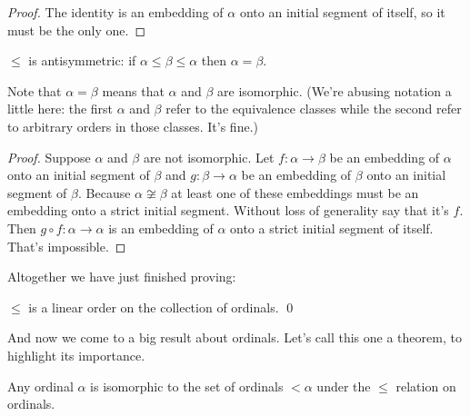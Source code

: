 \documentclass[10pt]{amsart}
\begin{document}
\begin{proof}
The identity is an  embedding of $\alpha$ onto an initial segment of itself, so it must be the only one.
\end{proof}


\begin{proposition}
$\le$ is antisymmetric: if $\alpha \le \beta \le \alpha$ then $\alpha = \beta$. 
\end{proposition}

Note that $\alpha = \beta$ means that $\alpha$ and $\beta$ are isomorphic. (We're abusing notation a little here: the first $\alpha$ and $\beta$ refer to the equivalence classes while the second refer to arbitrary orders in those classes. It's fine.)

\begin{proof}
Suppose $\alpha$ and $\beta$ are not isomorphic.
Let $f : \alpha \to \beta$ be an embedding of $\alpha$ onto an initial segment of $\beta$ and $g : \beta \to \alpha$ be an embedding of $\beta$ onto an initial segment of $\beta$. Because $\alpha \not \cong \beta$ at least one of these embeddings must be an embedding onto a strict initial segment. Without loss of generality say that it's $f$. Then $g \circ f : \alpha \to \alpha$ is an embedding of $\alpha$ onto a strict initial segment of itself. That's impossible.
\end{proof}

Altogether we have just finished proving:

\begin{lemma}
$\le$ is a linear order on the collection of ordinals. \qed
\end{lemma}

And now we come to a big result about ordinals. Let's call this one a theorem, to highlight its importance.

\begin{theorem}
Any ordinal $\alpha$ is isomorphic to the set of ordinals $< \alpha$ under the $\le$ relation on ordinals.
\end{theorem}
\end{document}
